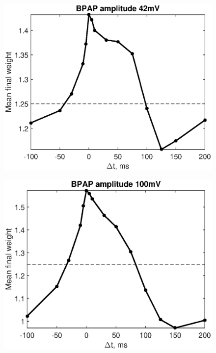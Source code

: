 \documentclass[a4paper,12pt]{report}
\theoremstyle{definition}
\begin{document}
\begin{figure}
\centering
\begin{minipage}{.5\textwidth}
  \centering
  \includegraphics[width=1\linewidth]{figures/valid_stdp_bpap42.eps}
  \label{fig:test1}
\end{minipage}%
\begin{minipage}{.5\textwidth}
  \centering
  \includegraphics[width=1\linewidth]{figures/valid_stdp_bpap100.eps}
  \label{fig:test2}
\end{minipage}
\end{figure}
\end{document}
